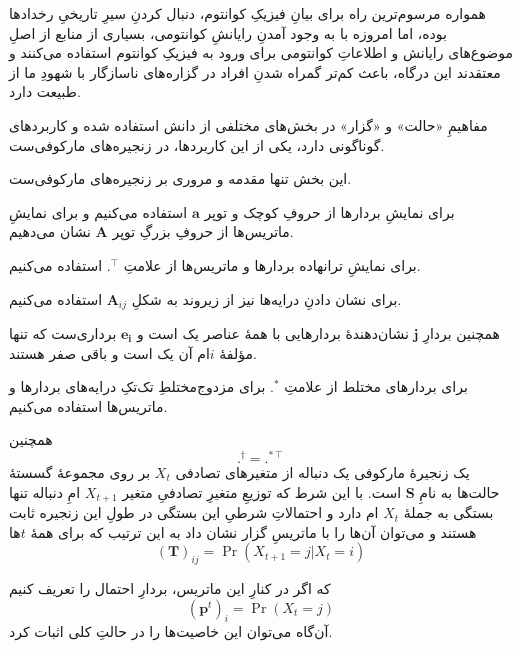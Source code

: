 


همواره مرسوم‌ترین راه برای بیانِ فیزیکِ کوانتوم، دنبال کردنِ سیرِ تاریخیِ رخدادها بوده، اما امروزه با به وجود آمدنِ رایانشِ کوانتومی، بسیاری از منابع از اصلِ موضوع‌های رایانش و اطلاعاتِ کوانتومی برای ورود به فیزیکِ کوانتوم استفاده می‌کنند و معتقدند این درگاه، باعث کم‌تر گمراه شدنِ افراد در گزاره‌های ناسازگار با شهودِ ما از طبیعت دارد.

مفاهیمِ «حالت» و «گزار» در بخش‌های مختلفی از دانش استفاده شده و کاربردهای گوناگونی دارد، یکی از این کاربردها، در زنجیره‌های مارکوفی‌ست.

این بخش تنها مقدمه و مروری بر زنجیره‌های مارکوفی‌ست.

برای نمایشِ بردارها از حروفِ کوچک و توپر 
\( \mathbf{a} \)
استفاده می‌کنیم و برای نمایشِ ماتریس‌ها از حروفِ بزرگِ تو‌پر
\( \mathbf{A} \)
نشان می‌دهیم.

برای نمایشِ ترانهاده بردارها و ماتریس‌ها از علامتِ
\( .^\intercal \)
استفاده می‌کنیم.

برای نشان دادنِ درایه‌ها نیز از زیروند به شکلِ
\( \mathbf{A}_{ij} \)
استفاده می‌کنیم.

همچنین بردارِ 
\( \mathbf{j} \)
نشان‌دهندهٔ بردارهایی با همهٔ عناصر یک است و
\( \mathbf{e_i} \)
برداری‌ست که تنها مؤلفهٔ \( i \)ام آن یک است و باقی صفر هستند.

برای بردارهای  مختلط از علامتِ 
\( .^* \)
برای مزدوج‌مختلطِ تک‌تکِ درایه‌های بردارها و ماتریس‌ها استفاده می‌کنیم.

همچنین
\begin{equation} .^\dagger = .^{*\intercal} \end{equation}
یک زنجیرهٔ مارکوفی یک دنباله از متغیرهای تصادفی \( X_t \)‌ بر روی مجموعهٔ گسستهٔ حالت‌ها به نامِ 
\( \mathbf{S} \)
 است. با این شرط که توزیعِ متغیرِ تصادفیِ متغیر 
\( X_{t+1} \)
 امِ دنباله تنها بستگی به جملهٔ 
\( X_{t} \)
 ام دارد و احتمالاتِ شرطیِ این بستگی در طولِ این زنجیره ثابت هستند و می‌توان آن‌ها را با ماتریسِ گزار نشان داد به این ترتیب که برای همهٔ \( t \)ها
\begin{equation} (\mathbf{T})_{ij} = \Pr(X_{t+1} = j | X_t = i) \end{equation}

که اگر در کنارِ این ماتریس، بردارِ احتمال را تعریف کنیم
\begin{equation} (\mathbf{p}^t)_i = \Pr(X_t = j) \end{equation}
آن‌گاه می‌توان این خاصیت‌ها را در حالتِ کلی اثبات کرد.

